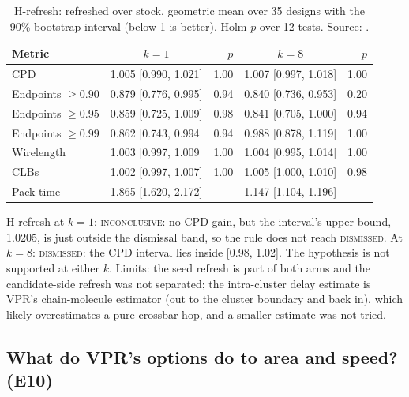 \begin{table}[t]
\caption{H-refresh: refreshed over stock, geometric mean over 35 designs with the 90\% bootstrap interval (below 1 is better). Holm $p$ over 12 tests. Source: .}
\label{tab:refresh}
\centering\footnotesize\setlength{\tabcolsep}{3pt}
\begin{tabular}{@{}lcrcr@{}}
\toprule
Metric & $k=1$ & $p$ & $k=8$ & $p$ \\
\midrule
CPD & 1.005 [0.990, 1.021] & 1.00 & 1.007 [0.997, 1.018] & 1.00 \\
Endpoints $\geq0.90$ & 0.879 [0.776, 0.995] & 0.94 & 0.840 [0.736, 0.953] & 0.20 \\
Endpoints $\geq0.95$ & 0.859 [0.725, 1.009] & 0.98 & 0.841 [0.705, 1.000] & 0.94 \\
Endpoints $\geq0.99$ & 0.862 [0.743, 0.994] & 0.94 & 0.988 [0.878, 1.119] & 1.00 \\
Wirelength & 1.003 [0.997, 1.009] & 1.00 & 1.004 [0.995, 1.014] & 1.00 \\
CLBs & 1.002 [0.997, 1.007] & 1.00 & 1.005 [1.000, 1.010] & 0.98 \\
Pack time & 1.865 [1.620, 2.172] & -- & 1.147 [1.104, 1.196] & -- \\
\bottomrule
\end{tabular}
\end{table}

 H-refresh at $k=1$: \textsc{inconclusive}: no CPD gain, but the interval's upper bound, 1.0205, is just outside the dismissal band, so the rule does not reach \textsc{dismissed}. At $k=8$: \textsc{dismissed}: the CPD interval lies inside [0.98, 1.02]. The hypothesis is not supported at either $k$. Limits: the seed refresh is part of both arms and the candidate-side refresh was not separated; the intra-cluster delay estimate is VPR's chain-molecule estimator (out to the cluster boundary and back in), which likely overestimates a pure crossbar hop, and a smaller estimate was not tried.

\subsection{What do VPR's options do to area and speed? (E10)}
\label{sec:e10}

